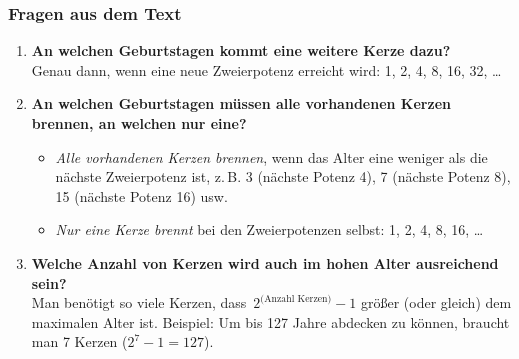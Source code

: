 \documentclass[a4paper,12pt]{article}
\begin{document}
                                                                             \subsubsection*{Fragen aus dem Text}
                                                                             \begin{enumerate}
                                                                               \item \textbf{An welchen Geburtstagen kommt eine weitere Kerze dazu?} \\
                                                                                 Genau dann, wenn eine neue Zweierpotenz erreicht wird: 1, 2, 4, 8, 16, 32, \dots

                                                                                   \item \textbf{An welchen Geburtstagen müssen alle vorhandenen Kerzen brennen, an welchen nur eine?}
                                                                                     \begin{itemize}
                                                                                         \item \emph{Alle vorhandenen Kerzen brennen}, wenn das Alter eine weniger als die nächste Zweierpotenz ist, z.\,B. 3 (nächste Potenz 4), 7 (nächste Potenz 8), 15 (nächste Potenz 16) usw.
                                                                                             \item \emph{Nur eine Kerze brennt} bei den Zweierpotenzen selbst: 1, 2, 4, 8, 16, \dots
                                                                                               \end{itemize}

                                                                                                 \item \textbf{Welche Anzahl von Kerzen wird auch im hohen Alter ausreichend sein?} \\
                                                                                                   Man benötigt so viele Kerzen, dass \(\,2^{\text{(Anzahl Kerzen)}} - 1\) größer (oder gleich) dem maximalen Alter ist. Beispiel: Um bis 127 Jahre abdecken zu können, braucht man 7 Kerzen (\(2^7 - 1 = 127\)).
                                                                                                   \end{enumerate}
\end{document}
